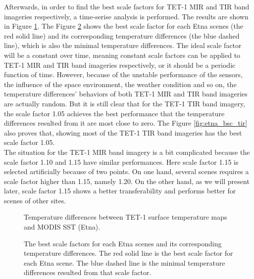 \noindent Afterwards, in order to find the best scale factors for TET-1 MIR and TIR band imageries respectively, a time-serise analysis is performed. The results are shown in Figure \ref{fig:etna_sc_mir_tir}. The Figure \ref{fig:etna_bsc_tem} shows the best scale factor for each Etna scenes (the red solid line) and its corresponding temperature differences (the blue dashed line), which is also the minimal temperature differences. The ideal scale factor will be a constant over time, meaning constant scale factors can be applied to TET-1 MIR and TIR band imageries respectively, or it should be a periodic function of time. However, because of the unstable performance of the sensors, the influence of the space environment, the weather condition and so on, the temperature differences' behaviors of both TET-1 MIR and TIR band imageries are actually random. But it is still clear that for the TET-1 TIR band imagery, the scale factor 1.05 achieves the best performance that the temperature differences resulted from it are most close to zero. The Figure \ref{fig:etna_bsc_tir} also proves that, showing most of the TET-1 TIR band imageries has the best scale factor 1.05.\\

\noindent The situation for the TET-1 MIR band imagery is a bit complicated because the scale factor 1.10 and 1.15 have similar performances. Here scale factor 1.15 is selected artificially because of two points. On one hand, several scenes requires a scale factor higher than 1.15, namely 1.20. On the other hand, as we will present later, scale factor 1.15 shows a better transferability and performs better for scenes of other sites.\\

\begin{figure}[!htbp]
\centering
{}
\hspace{0.5in}
\caption{Temperature differences between TET-1 surface temperature maps and MODIS SST (Etna).}
\label{fig:etna_sc_mir_tir}
\end{figure}

\begin{figure}[!htbp]
\centering
{}
\hspace{0.5in}
\caption{The best scale factors for each Etna scenes and its corresponding temperature differences. The red solid line is the best scale factor for each Etna scene. The blue dashed line is the minimal temperature differences resulted from that scale factor.}
\label{fig:etna_bsc_tem}
\end{figure}

